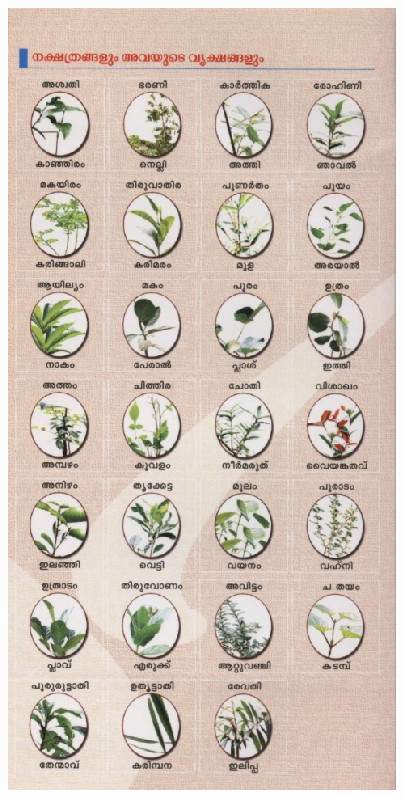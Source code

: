 \documentclass[10pt,a4paper]{report}
\begin{document}
      \begin{figure}[H]
  \center
\includegraphics[scale=2]{images/nv} 
\label{nv3}
\caption{  }
\end{figure}
%
\end{document}
